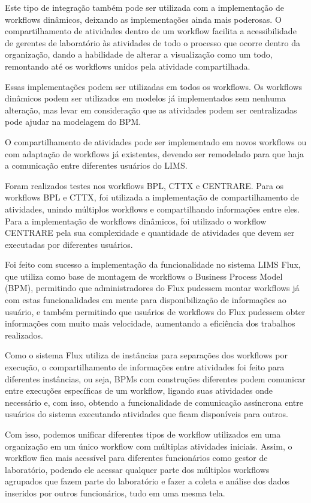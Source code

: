 Este tipo de integração também pode ser utilizada com a implementação de workflows dinâmicos, deixando as implementações ainda mais poderosas. O compartilhamento de atividades dentro de um workflow facilita a acessibilidade de gerentes de laboratório às atividades de todo o processo que ocorre dentro da organização, dando a habilidade de alterar a visualização como um todo, remontando até os workflows unidos pela atividade compartilhada.

Essas implementações podem ser utilizadas em todos os workflows. Os workflows dinâmicos podem ser utilizados em modelos já implementados sem nenhuma alteração, mas levar em consideração que as atividades podem ser centralizadas pode ajudar na modelagem do BPM.

O compartilhamento de atividades pode ser implementado em novos workflows ou com adaptação de workflows já existentes, devendo ser remodelado para que haja a comunicação entre diferentes usuários do LIMS.

Foram realizados testes nos workflows BPL, CTTX e CENTRARE. Para os workflows BPL e CTTX, foi utilizada a implementação de compartilhamento de atividades, unindo múltiplos workflows e compartilhando informações entre eles. Para a implementação de workflows dinâmicos, foi utilizado o workflow CENTRARE pela sua complexidade e quantidade de atividades que devem ser executadas por diferentes usuários.

Foi feito com sucesso a implementação da funcionalidade no sistema LIMS Flux, que utiliza como base de montagem de workflows o Business Process Model (BPM), permitindo que administradores do Flux pudessem montar workflows já com estas funcionalidades em mente para disponibilização de informações ao usuário, e também permitindo que usuários de workflows do Flux pudessem obter informações com muito mais velocidade, aumentando a eficiência dos trabalhos realizados.

Como o sistema Flux utiliza de instâncias para separações dos workflows por execução, o compartilhamento de informações entre atividades foi feito para diferentes instâncias, ou seja, BPMs com construções diferentes podem comunicar entre execuções específicas de um workflow, ligando suas atividades onde necessário e, com isso, obtendo a funcionalidade de comunicação assíncrona entre usuários do sistema executando atividades que ficam disponíveis para outros.

Com isso, podemos unificar diferentes tipos de workflow utilizados em uma organização em um único workflow com múltiplas atividades iniciais. Assim, o workflow fica mais acessível para diferentes funcionários como gestor de laboratório, podendo ele acessar qualquer parte dos múltiplos workflows agrupados que fazem parte do laboratório e fazer a coleta e análise dos dados inseridos por outros funcionários, tudo em uma mesma tela.

